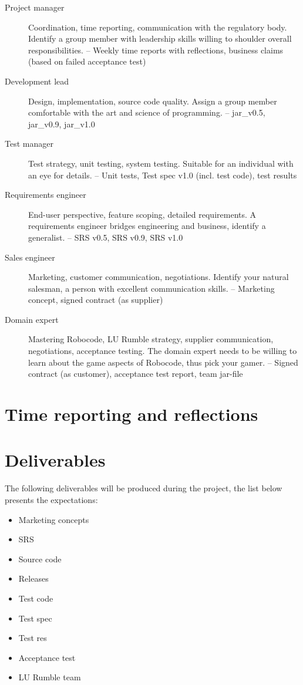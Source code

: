 \documentclass{scrreprt}
\begin{document}
\begin{description}
\item[Project manager] Coordination, time reporting, communication with the regulatory body. Identify a group member with leadership skills willing to shoulder overall responsibilities. -- Weekly time reports with reflections, business claims (based on failed acceptance test)
\item[Development lead] Design, implementation, source code quality. Assign a group member comfortable with the art and science of programming. -- jar_v0.5, jar_v0.9, jar_v1.0
\item[Test manager] Test strategy, unit testing, system testing. Suitable for an individual with an eye for details. -- Unit tests, Test spec v1.0 (incl. test code), test results
\item[Requirements engineer] End-user perspective, feature scoping, detailed requirements. A requirements engineer bridges engineering and business, identify a generalist. -- SRS v0.5, SRS v0.9, SRS v1.0
\item[Sales engineer] Marketing, customer communication, negotiations. Identify your natural salesman, a person with excellent communication skills. -- Marketing concept, signed contract (as supplier)
\item[Domain expert] Mastering Robocode, LU Rumble strategy, supplier communication, negotiations, acceptance testing. The domain expert needs to be willing to learn about the game aspects of Robocode, thus pick your gamer. -- Signed contract (as customer), acceptance test report, team jar-file
\end{description}

\section{Time reporting and reflections} \label{sec:time}


\section{Deliverables}
The following deliverables will be produced during the project, the list below presents the expectations:

\begin{itemize}
\item Marketing concepts
\item SRS
\item Source code
\item Releases
\item Test code
\item Test spec
\item Test res
\item Acceptance test
\item LU Rumble team
\end{itemize}
\end{document}
